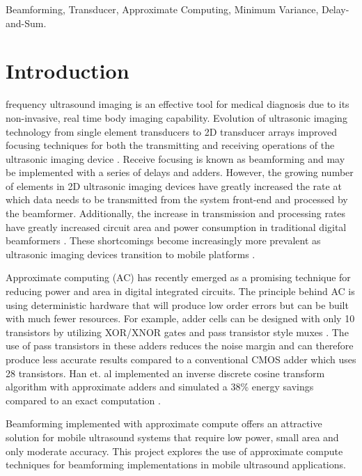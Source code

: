 \documentclass[journal]{IEEEtran}
\begin{document}
\begin{IEEEkeywords}
Beamforming, Transducer, Approximate Computing, Minimum Variance, Delay-and-Sum.
\end{IEEEkeywords}


\IEEEpeerreviewmaketitle



\section{Introduction}

 frequency ultrasound imaging is an effective tool for medical diagnosis due to its non-invasive, real time body imaging capability. Evolution of ultrasonic imaging technology from single element transducers to 2D transducer arrays improved focusing techniques for both the transmitting and receiving operations of the ultrasonic imaging device \cite{2dCMUT}. Receive focusing is known as beamforming and may be implemented with a series of delays and adders. However, the growing number of elements in 2D ultrasonic imaging devices have greatly increased the rate at which data needs to be transmitted from the system front-end and processed by the beamformer. Additionally, the increase in transmission and processing rates have greatly increased circuit area and power consumption in traditional digital beamformers \cite{ultrasoundLinearArray}. These shortcomings become increasingly more prevalent as ultrasonic imaging devices transition to mobile platforms \cite{mobileUltrasound}. 



Approximate computing (AC) has recently emerged as a promising technique for reducing power and area in digital integrated circuits. The principle behind AC is using deterministic hardware that will produce low order errors but can be built with much fewer resources. For example, adder cells can be designed with only 10 transistors by utilizing XOR/XNOR gates and pass transistor style muxes \cite{yang2013approximate}. The use of pass transistors in these adders reduces the noise margin and can therefore produce less accurate results compared to a conventional CMOS adder which uses 28 transistors. Han et. al implemented an inverse discrete cosine transform algorithm with approximate adders and simulated a 38\% energy savings compared to an exact computation \cite{han2013approximate}.

Beamforming implemented with approximate compute offers an attractive solution for mobile ultrasound systems that require low power, small area and only moderate accuracy. This project explores the use of approximate compute techniques for beamforming implementations in mobile ultrasound applications. 
\end{document}
